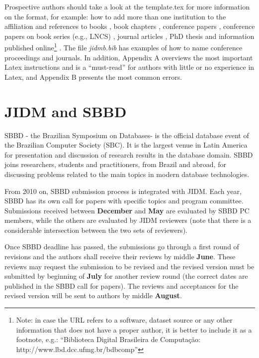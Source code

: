\documentclass[jidm,a4paper]{jidm} %
\begin{document}
Prospective authors should take a look at the template.tex for more information on the format, for example: how to add more than one institution to the affiliation and  references to books \cite{Baeza-YatesR99}, book chapters \cite{BorgidaCL09}, conference papers \cite{FerreiraGALV09}, conference papers on book series (e.g., LNCS) \cite{SilvaLC96}, journal articles \cite{LaenderMNM09}, PhD thesis \cite{Moro07} and information published online\footnote{Note: in case the URL refers to a software, dataset source or any other information that does not have a proper author, it is better to include it as a footnote, e.g.: ``Biblioteca Digital Brasileira de Computa\c{c}\~{a}o: http://www.lbd.dcc.ufmg.br/bdbcomp''} \cite{xpath}. The file \textit{jidmb.bib} has examples of how to name conference proceedings and journals. In addition, Appendix A overviews the most important Latex instructions and is a ``must-read'' for authors with little or no experience in Latex, and Appendix B presents the most common errors.

\section{JIDM and SBBD}

SBBD - the Brazilian Symposium on Databases- is the official database event of the Brazilian Computer Society (SBC). It is the largest venue in Latin America for presentation and discussion of research results in the database domain. SBBD joins researchers, students and practitioners, from Brazil and abroad, for discussing problems related to the main topics in modern database technologies. 

From 2010 on, SBBD submission process is integrated with JIDM. 
Each year, SBBD has its own call for papers with specific topics and program committee. Submissions received between \textbf{December} and \textbf{May} are evaluated by SBBD PC members, while the others are evaluated by JIDM reviewers (note that there is a considerable intersection between the two sets of reviewers).

Once SBBD deadline has passed, the submissions go through a first round of revisions and the authors shall receive their reviews by middle \textbf{June}. These reviews may request the submission to be revised and the revised version must be submitted by beginning of \textbf{July} for another review round (the correct dates are published in the SBBD call for papers). The reviews and acceptances for the revised version will be sent to authors by middle \textbf{August}.
\end{document}

